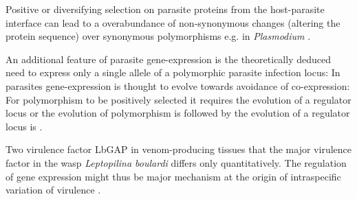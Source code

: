 Positive or diversifying selection on parasite proteins from the
host-parasite interface can lead to a overabundance of non-synonymous
changes (altering the protein sequence) over synonymous polymorphisms
e.g. in \textit{Plasmodium} \cite{pmid7630387}.

An additional feature of parasite gene-expression is the theoretically
deduced need to express only a single allele of a polymorphic parasite
infection locus: In parasites gene-expression is thought to evolve
towards avoidance of co-expression: For polymorphism to be positively
selected it requires the evolution of a regulator locus or the
evolution of polymorphism is followed by the evolution of a regulator
locus is \cite{pmid15913420}.

Two virulence factor LbGAP in venom-producing tissues that the major
virulence factor in the wasp \textit{Leptopilina boulardi} differs
only quantitatively. The regulation of gene expression might thus be
major mechanism at the origin of intraspecific variation of virulence
\cite{pmid21124871}.



     